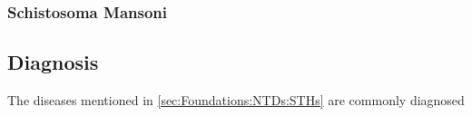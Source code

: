 \subsubsection{Schistosoma Mansoni}
\label{sec:Foundations:NTDs:STHs:Schistosoma}

\subsection{Diagnosis}
\label{sec:Foundations:NTDs:Diagnosis}

The diseases mentioned in \autoref{sec:Foundations:NTDs:STHs} are commonly diagnosed 
